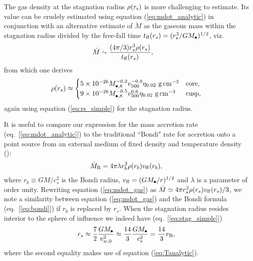 \documentclass[usenatbib,fleqn]{mn2e}
\newcommand{\rs}{r_s}
\newcommand{\rb}{r_b}
\newcommand{\Mbh}[1][]{M_{\bullet#1}}
\newcommand{\Mbheight}{M_{\bullet,8}}
\newcommand{\vwO}{v_{w,0}}
\newcommand{\tff}{t_{\rm ff}}
\begin{document}
The gas density at the stagnation radius $\rho(r_{\rm s})$ is more challenging to estimate.  Its value can be crudely estimated using equation (\ref{eq:mdot_analytic}) in conjunction with an alternative estimate of $\dot{M}$ as the gaseous mass within the stagnation radius divided by the free-fall time $t_{\rm ff}(\rs) = (r_{\rm s}^{3}/GM_{\bullet})^{1/2}$, viz.
\begin{align}
  &\dot{M}\sim\frac{(4 \pi/3) \rs^3 \rho(\rs)}{\tff(\rs)},
  \label{eq:mdot_gas}
\end{align}
from which one derives 
\begin{align}
  \rho(\rs)\approx
  \begin{cases}
    5 \times 10^{-26} \Mbheight^{-0.2} v_{500}^{-0.8}  \eta_{0.02} \,
    \, {\rm g \, cm^{-3}}& \text{core},\\
    9 \times 10^{-26}  \Mbheight^{-0.5} v_{500}^{0.6}  \eta_{0.02} \,\, {\rm g \,cm^{-3}} & \text{cusp},
  \end{cases}
  \label{eq:rhors}
\end{align}
again using equation (\ref{eq:rs_simple}) for the stagnation radius.  


It is useful to compare our expression for the mass accretion rate (eq.~[\ref{eq:mdot_analytic}]) to the traditional ``Bondi" rate for accretion onto a point source from an external medium of fixed density and temperature density (\citealt{Bondi52}):
\begin{align}
  \dot{M}_{\rm B} =4\pi \lambda r_b^2 \rho(r_b) v_{\rm ff}(r_b),
\label{eq:bondi}
\end{align}
where $r_b \equiv GM/c_{s}^{2}$ is the Bondi radius, $v_{\rm ff} = (GM_{\bullet}/r)^{1/2}$ and $\lambda$ is a parameter of order unity.  Rewriting equation (\ref{eq:mdot_gas}) as $\dot{M}\simeq 4\pi \rs^2 \rho(\rs) v_{\rm ff}(\rs)/3$,
we note a similarity between equation (\ref{eq:mdot_gas}) and the Bondi formula (eq.~[\ref{eq:bondi}]) if $\rb$ is replaced by $\rs$.  When the stagnation radius resides interior to the sphere of influence we indeed have (eq.~[\ref{eq:stag_simple}])
\begin{align}
  \rs\approx\frac{7}{2}\frac{G \Mbh}{\vwO^2} \approx \frac{14}{3}\frac{GM_{\bullet}}{c_{s}^{2}} = \frac{14}{3}r_{\rm B},
  \label{eq:rs_simple}
\end{align}
where the second equality makes use of equation (\ref{eq:Tanalytic}). 
\end{document}
